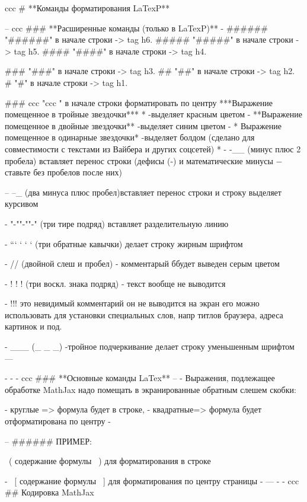 ﻿ccc # **Команды форматирования LaTexP**

-- ccc  ###  **Расширенные команды (только в LaTexP)**
- 
   ######      "######" в начале строки ->   tag h6.
   #####       "#####"  в начале строки ->   tag h5. 
   ####        "####"   в начале строки ->   tag h4.

   ###         "###" в начале строки -> tag h3.
   ##          "##" в начале строки -> tag h2.
   #           "#" в начале строки -> tag h1.

 
###  ccc  "ccc "  в начале строки форматировать по центру
***Выражение помещенное в тройные звездочки***
* 
  -выделяет красным цветом
-  
**Выражение помещенное в двойные звездочки**  -выделяет синим цветом
-  * Выражение помещенное в одинарные звездочки*  -выделяет болдом (сделано для совместимости с текстами из Вайбера и других соцсетей)
* 
-     -__        (минус плюс 2 пробела) вставляет перенос строки (дефисы (-) и математические минусы \(-\) ставьте без пробелов после них)

--     --_       (два минуса плюс пробел)вставляет перенос строки и строку выделяет курсивом

-     "-""-""-"  (три тире подряд) вставляет разделительную линию

-   ```  ` ` `  (три обратные кавычки) делает строку жирным шрифтом

-  //           (двойной слеш и пробел) - комментарый ббудет выведен серым цветом

-   ! ! !       (три воскл. знака подряд) -  текст вообще не выводится

-  !!!          это невидимый комментарий он не выводится на экран его можно использовать для установки специальных слов, напр титлов браузера, адреса картинок и под. 

-  ___          (_ _ _)  -тройное подчеркивание делает строку уменьшенным шрифтом
---  

-   
-  
-   
ccc  ###  **Основные команды LaTex**
-- 
- Выражения, подлежащее обработке MathJax надо помещать в экранированные обратным слешем скобки:

-    круглые =>  формула будет в строке, 
-    квадратные=>  формула будет отформатирована по центру 
-  
 

--   ###### ПРИМЕР:


 \ ( содержание формулы  \ )  для форматирования в строке

- \ [ содержание формулы  \ ] для форматирования по центру страницы  
-  
---
- 
-  
ccc ##  Кодировка MathJax



